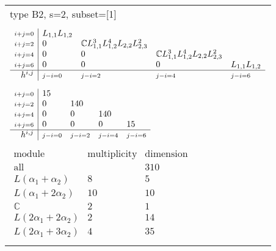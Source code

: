 \documentclass[crop,border=2mm]{standalone}
\begin{document}
\begin{tabular}{l}
{\huge type B2, s=2, subset=[1]}\\ \\


$\displaystyle
\begin{array}{r|l l l l}
	{\scriptstyle i+j=0}&L_{1,1}L_{1,2}&&&\\
	{\scriptstyle i+j=2}&0&\mathbb{C}L_{1,1}^{3}L_{1,2}^{4}L_{2,2}L_{2,3}^{2}&&\\
	{\scriptstyle i+j=4}&0&0&\mathbb{C}L_{1,1}^{3}L_{1,2}^{4}L_{2,2}L_{2,3}^{2}&\\
	{\scriptstyle i+j=6}&0&0&0&L_{1,1}L_{1,2}\\
	\hline h^{i,j}&{\scriptstyle j-i=0}&{\scriptstyle j-i=2}&{\scriptstyle j-i=4}&{\scriptstyle j-i=6}
\end{array}
$ \\ \\


$\displaystyle
\begin{array}{r|l l l l}
	{\scriptstyle i+j=0}&15&&&\\
	{\scriptstyle i+j=2}&0&140&&\\
	{\scriptstyle i+j=4}&0&0&140&\\
	{\scriptstyle i+j=6}&0&0&0&15\\
	\hline h^{i,j}&{\scriptstyle j-i=0}&{\scriptstyle j-i=2}&{\scriptstyle j-i=4}&{\scriptstyle j-i=6}
\end{array}
$ \\ \\


$\displaystyle
\begin{array}{rll}
	\text{module}&\text{multiplicity}&\text{dimension} \\ \hline \text{all}&&310 \\
	L\left(\alpha_{1}+\alpha_{2}\right)&8&5\\
	L\left(\alpha_{1}+ 2\alpha_{2}\right)&10&10\\
	\mathbb{C}&2&1\\
	L\left( 2\alpha_{1}+ 2\alpha_{2}\right)&2&14\\
	L\left( 2\alpha_{1}+ 3\alpha_{2}\right)&4&35
\end{array}
$ \\ \\

\end{tabular}
\end{document}
